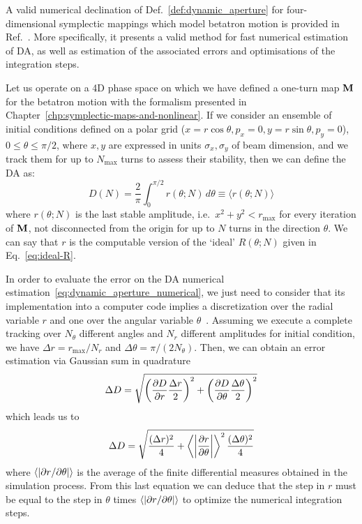 A valid numerical declination of Def.~\ref{def:dynamic_aperture} for four-dimensional symplectic mappings which model betatron motion is provided in Ref.~\cite{todesco1996dynamic}. More specifically, it presents a valid method for fast numerical estimation of DA, as well as estimation of the associated errors and optimisations of the integration steps. 

Let us operate on a 4D phase space on which we have defined a one-turn map \(\vb{M}\) for the betatron motion with the formalism presented in Chapter~\ref{chp:symplectic-maps-and-nonlinear}. If we consider an ensemble of initial conditions defined on a polar grid (\(x=r\cos\theta, p_x=0, y=r\sin\theta, p_y=0\)), \(0\leq\theta\leq\pi/2\), where \(x,y\) are expressed in units \(\sigma_x, \sigma_y\) of beam dimension, and we track them for up to \(N_{\text{max}}\) turns to assess their stability, then we can define the DA as:
\begin{equation}
	D(N) = \frac{2}{\pi}\int_0^{\pi/2} r(\theta;N)\,d\theta \equiv \langle r(\theta;N)\rangle
	\label{eq:dynamic_aperture_numerical}
\end{equation}
where \(r(\theta;N)\) is the last stable amplitude, i.e.\ \(x^2 + y^2 < r_{\mathrm{max}}\) for every iteration of \(\vb{M}\), not disconnected from the origin for up to \(N\) turns in the direction \(\theta\). We can say that \(r\) is the computable version of the `ideal' \(R(\theta;N)\) given in Eq.~\eqref{eq:ideal-R}.

In order to evaluate the error on the DA numerical estimation~\eqref{eq:dynamic_aperture_numerical}, we just need to consider that its implementation into a computer code implies a discretization over the radial variable \(r\) and one over the angular variable \(\theta\)~\cite{giovannozzi1998dynamic}. Assuming we execute a complete tracking over \(N_\theta\) different angles and \(N_r\) different amplitudes for initial condition, we have \(\Delta r = r_\text{max}/N_r\) and \(\Delta\theta = \pi/(2N_\theta)\). Then, we can obtain an error estimation via Gaussian sum in quadrature
\begin{equation}
	\Delta D = \sqrt{\left(\pdv{D}{r}\/\frac{\Delta r}{2}\right)^2 + \left(\pdv{D}{\theta}\/\frac{\Delta\theta}{2}\right)^2}
\end{equation}
which leads us to
\begin{equation}
	\Delta D = \sqrt{\frac{(\Delta r)^2}{4} + \left\langle\abs{\pdv{r}{\theta}\/}\right\rangle^2 \frac{(\Delta\theta)^2}{4}}
\end{equation}
where \(\langle\abs{\partial r/\partial\theta}\rangle\) is the average of the finite differential measures obtained in the simulation process.
From this last equation we can deduce that the step in \(r\) must be equal to the step in \(\theta\) times \(\langle\abs{\partial r/\partial\theta}\rangle\) to optimize the numerical integration steps.

